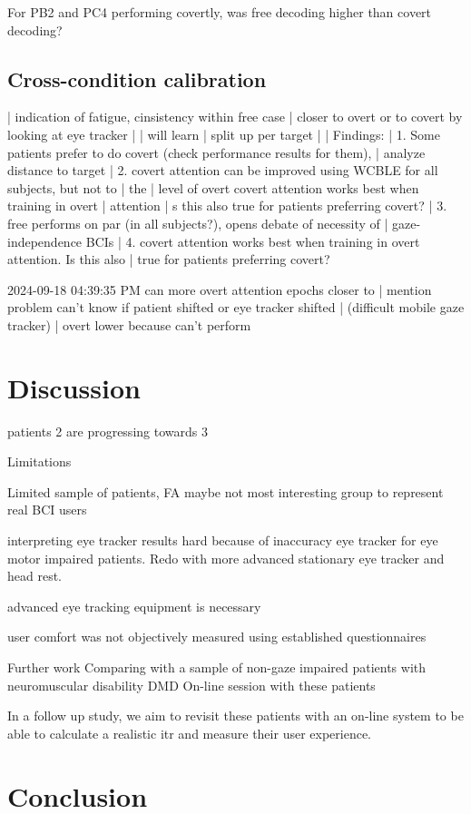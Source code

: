 For PB2 and PC4 performing covertly, was free decoding higher than covert
decoding?

\subsection{Cross-condition calibration}

| indication of fatigue, cinsistency within free case
| closer to overt or to covert by looking at eye tracker
|
| will learn
| split up per target
|
| Findings:
| 1. Some patients prefer to do covert (check performance results for them),
|    analyze distance to target
| 2. covert attention can be improved using WCBLE for all subjects, but not to
| the
|    level of overt covert attention works best when training in overt
| attention
| s this also true for patients preferring covert?
| 3. free performs on par (in all subjects?), opens debate of necessity of
|    gaze-independence BCIs
| 4. covert attention works best when training in overt attention. Is this also
|    true for patients preferring covert?

2024-09-18 04:39:35 PM can more overt attention epochs closer to
| mention problem can't know if patient shifted or eye tracker shifted
| (difficult mobile gaze tracker)
| overt lower because can't perform

\section{Discussion}

patients 2 are progressing towards 3

Limitations

Limited sample of patients, FA maybe not most interesting group to represent
real BCI users

interpreting eye tracker results hard because of inaccuracy eye tracker for eye
motor impaired patients. Redo with more advanced stationary eye tracker and
head rest.

advanced eye tracking equipment is necessary

user comfort was not objectively measured using established questionnaires

Further work
Comparing with a sample of non-gaze impaired patients with  neuromuscular
disability DMD
On-line session with these patients

In a follow up study, we aim to revisit these patients with an on-line system
to be able to calculate a realistic \ac{itr} and measure their user experience.

\section{Conclusion}

